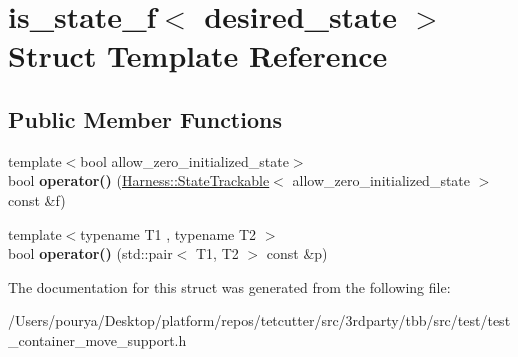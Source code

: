 \hypertarget{structis__state__f}{}\section{is\+\_\+state\+\_\+f$<$ desired\+\_\+state $>$ Struct Template Reference}
\label{structis__state__f}
\subsection*{Public Member Functions}
\begin{DoxyCompactItemize}
\item 
\hypertarget{structis__state__f_af5fb1bbfabb43af098b72bd659217be6}{}{\footnotesize template$<$bool allow\+\_\+zero\+\_\+initialized\+\_\+state$>$ }\\bool {\bfseries operator()} (\hyperlink{structHarness_1_1StateTrackable}{Harness\+::\+State\+Trackable}$<$ allow\+\_\+zero\+\_\+initialized\+\_\+state $>$ const \&f)\label{structis__state__f_af5fb1bbfabb43af098b72bd659217be6}

\item 
\hypertarget{structis__state__f_a4a2d19a7e2617d67b8b672c9aec50926}{}{\footnotesize template$<$typename T1 , typename T2 $>$ }\\bool {\bfseries operator()} (std\+::pair$<$ T1, T2 $>$ const \&p)\label{structis__state__f_a4a2d19a7e2617d67b8b672c9aec50926}

\end{DoxyCompactItemize}


The documentation for this struct was generated from the following file\+:\begin{DoxyCompactItemize}
\item 
/\+Users/pourya/\+Desktop/platform/repos/tetcutter/src/3rdparty/tbb/src/test/test\+\_\+container\+\_\+move\+\_\+support.\+h\end{DoxyCompactItemize}
